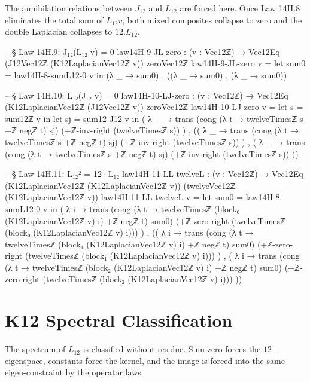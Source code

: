 \documentclass[11pt,a4paper]{book}
\def\cdot{.}%
\def\texorpdfstring#1#2{#2}%
\begin{document}
The annihilation relations between $J_{12}$ and $L_{12}$ are forced here.
Once Law 14H.8 eliminates the total sum of $L_{12} v$, both mixed composites
collapse to zero and the double Laplacian collapses to $12 \cdot L_{12}$.

\begin{code}
  -- § Law 14H.9: J₁₂(L₁₂ v) = 0
  law14H-9-JL-zero : (v : Vec12ℤ) → Vec12Eq (J12Vec12ℤ (K12LaplacianVec12ℤ v)) zeroVec12ℤ
  law14H-9-JL-zero v =
    let sum0 = law14H-8-sumL12-0 v in
    (λ _ → sum0) ,
    ((λ _ → sum0) ,
     (λ _ → sum0))

  -- § Law 14H.10: L₁₂(J₁₂ v) = 0
  law14H-10-LJ-zero : (v : Vec12ℤ) → Vec12Eq (K12LaplacianVec12ℤ (J12Vec12ℤ v)) zeroVec12ℤ
  law14H-10-LJ-zero v =
    let s = sum12ℤ v in
    let sj = sum12-J12 v in
    ( λ _ →
        trans
          (cong (λ t → twelveTimesℤ s +ℤ negℤ t) sj)
          (+ℤ-inv-right (twelveTimesℤ s))
    ) ,
    (( λ _ →
          trans
            (cong (λ t → twelveTimesℤ s +ℤ negℤ t) sj)
            (+ℤ-inv-right (twelveTimesℤ s))
      ) ,
     ( λ _ →
          trans
            (cong (λ t → twelveTimesℤ s +ℤ negℤ t) sj)
            (+ℤ-inv-right (twelveTimesℤ s))
      ))

  -- § Law 14H.11: L₁₂² = 12·L₁₂
  law14H-11-LL-twelveL : (v : Vec12ℤ) → Vec12Eq (K12LaplacianVec12ℤ (K12LaplacianVec12ℤ v)) (twelveVec12ℤ (K12LaplacianVec12ℤ v))
  law14H-11-LL-twelveL v =
    let sum0 = law14H-8-sumL12-0 v in
    ( λ i →
        trans
          (cong (λ t → twelveTimesℤ (block₀ (K12LaplacianVec12ℤ v) i) +ℤ negℤ t) sum0)
          (+ℤ-zero-right (twelveTimesℤ (block₀ (K12LaplacianVec12ℤ v) i)))
    ) ,
    (( λ i →
          trans
            (cong (λ t → twelveTimesℤ (block₁ (K12LaplacianVec12ℤ v) i) +ℤ negℤ t) sum0)
            (+ℤ-zero-right (twelveTimesℤ (block₁ (K12LaplacianVec12ℤ v) i)))
      ) ,
     ( λ i →
          trans
            (cong (λ t → twelveTimesℤ (block₂ (K12LaplacianVec12ℤ v) i) +ℤ negℤ t) sum0)
            (+ℤ-zero-right (twelveTimesℤ (block₂ (K12LaplacianVec12ℤ v) i)))
      ))
\end{code}

\section{K\texorpdfstring{$_{12}$}{12} Spectral Classification}

The spectrum of $L_{12}$ is classified without residue.
Sum-zero forces the $12$-eigenspace, constants force the kernel, and the image
is forced into the same eigen-constraint by the operator laws.
\end{document}
